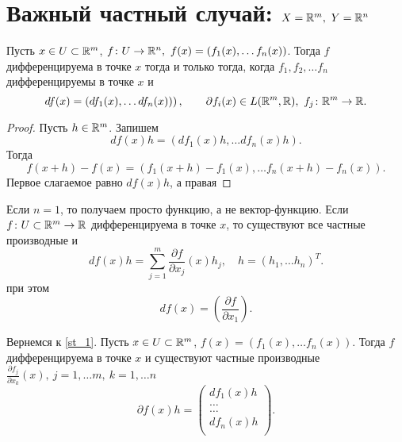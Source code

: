 % 
% 

\section{Важный частный случай: $ X=\mathbb{R}^{m} ,~ Y=\mathbb{R}^{n} $}

\begin{st}\label{st_1}
    Пусть $ x \in U \subset \mathbb{R}^{m}$, $ f \colon U \to \mathbb{R}^{n}, ~ f(x) = \left( f_1(x), \ldots f_n(x) \right) $. Тогда $ f$ дифференцируема в точке $ x$ тогда и только тогда, когда $ f_1, f_2, \ldots f_n$ дифференцируемы в точке $ x$ и 
     \[
	 df(x) = \left( df_1(x), \ldots df_n(x)) \right) , \qquad \partial f_i (x) \in  L(\mathbb{R}^{m}, \mathbb{R}), ~ f_j \colon \mathbb{R}^{m} \to  \mathbb{R}
    .\] 
\end{st}
\begin{proof}
    Пусть $ h \in \mathbb{R}^{m}$. Запишем 
    \[
	df(x)h = \left( df_1(x)h, \ldots df_n(x)h \right) 
    .\] 
    Тогда
    \[
	f(x+h) - f(x) = \left( f_1(x+h) - f_1(x), \ldots f_n(x+h)-f_n(x) \right) 
    .\] 
    Первое слагаемое равно $ df(x)h$, а правая %
\end{proof}
\begin{st}
    Если $ n=1$, то получаем просто функцию, а не вектор-функцию. Если $ f \colon U \subset \mathbb{R}^{m} \to  \mathbb{R}$ дифференцируема в точке $ x$, то существуют все частные производные и
    \[
	df(x)h = \sum_{j=1}^{m} \frac{ \partial f}{ \partial x_j}(x)h_j, \quad h = (h_1, \ldots h_n)^{T}
    .\] 
    при этом 
    \[
	df(x) = \left( \frac{ \partial f}{ \partial x_1} \right) 
    .\] 
\end{st}
\begin{st}
    Вернемся к \ref{st_1}. Пусть $ x \in U \subset \mathbb{R}^{m}$, $ f(x) = \left( f_1(x), \ldots f_n(x) \right) $. Тогда $ f$ дифференцируема в точке $ x$ и существуют частные производные $ \frac{ \partial f_j}{ \partial x_k}(x), ~ j = 1, \ldots m, ~ k = 1, \ldots n$
    \[
	\partial f(x) h = 
	\begin{pmatrix}
	    df_1(x)h \\
	    \dots \\
	    \dots \\
	    df_n(x)h \\
	\end{pmatrix}
    .\] 
\end{st}
